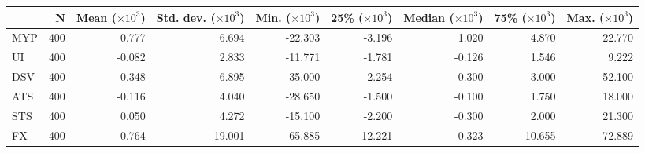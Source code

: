 \begin{tabular}{lrrrrrrrr} 
 \hline 
 \hline
 & N & Mean ($\times 10^3$) & Std. dev. ($\times 10^3$) & Min. ($\times 10^3$) & 25\% ($\times 10^3$) & Median ($\times 10^3$) & 75\% ($\times 10^3$) & Max. ($\times 10^3$) \\
\hline 
 MYP & 400 & 0.777 & 6.694 & -22.303 & -3.196 & 1.020 & 4.870 & 22.770 \\
UI & 400 & -0.082 & 2.833 & -11.771 & -1.781 & -0.126 & 1.546 & 9.222 \\
DSV & 400 & 0.348 & 6.895 & -35.000 & -2.254 & 0.300 & 3.000 & 52.100 \\
ATS & 400 & -0.116 & 4.040 & -28.650 & -1.500 & -0.100 & 1.750 & 18.000 \\
STS & 400 & 0.050 & 4.272 & -15.100 & -2.200 & -0.300 & 2.000 & 21.300 \\
FX & 400 & -0.764 & 19.001 & -65.885 & -12.221 & -0.323 & 10.655 & 72.889 \\

 \hline \hline 
 \end{tabular}
